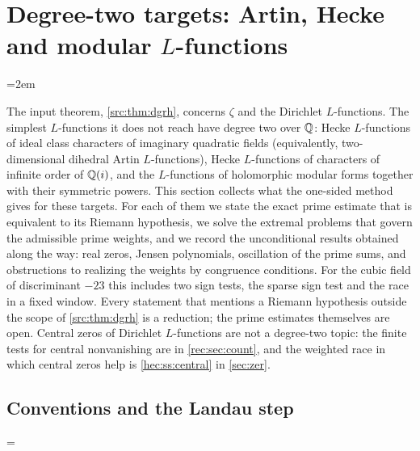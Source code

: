 \providecommand{\zerJ}{\mathcal{J}}
\providecommand{\zerK}{\mathcal{K}}
\providecommand{\zersinc}{\operatorname{sinc}}
\providecommand{\zergE}{\gamma_{\mathrm{E}}}
\providecommand{\zerLL}{\mathcal{L}}
\providecommand{\zerconv}{\operatorname{conv}}
\providecommand{\zerdiag}{\operatorname{diag}}
\providecommand{\zerSym}{\mathfrak{D}}
\providecommand{\zerLog}{\operatorname{Log}}
\section{Degree-two targets: Artin, Hecke and modular \texorpdfstring{$L$}{L}-functions}\label{sec:hec}

\providecommand{\hecsgn}{\operatorname{sgn}}
\providecommand{\hecVar}{\operatorname{Var}}
\providecommand{\hecCov}{\operatorname{Cov}}
\providecommand{\hecE}{\mathbb{E}}
\providecommand{\hecind}{\mathbf{1}}
\edef\hecsavedemergencystretch{\the\emergencystretch}
\emergencystretch=2em\relax

The input theorem, \cref{src:thm:dgrh}, concerns $\zeta$ and the Dirichlet $L$-functions. The simplest
$L$-functions it does not reach have degree two over $\mathbb{Q}$: Hecke $L$-functions of ideal class characters
of imaginary quadratic fields (equivalently, two-dimensional dihedral Artin $L$-functions), Hecke
$L$-functions of characters of infinite order of $\mathbb{Q}(i)$, and the $L$-functions of holomorphic
modular forms together with their symmetric powers. This section collects what the one-sided method
gives for these targets. For each of them we state the exact prime estimate that is equivalent to
its Riemann hypothesis, we solve the extremal problems that govern the admissible prime weights, and we
record the unconditional results obtained along the way: real zeros, Jensen polynomials, oscillation of
the prime sums, and obstructions to realizing the weights by congruence conditions. For the cubic field
of discriminant $-23$ this includes two sign tests, the sparse sign test and the race in a fixed window.
Every statement that mentions a Riemann hypothesis outside the scope of \cref{src:thm:dgrh} is a
reduction; the prime estimates themselves are open. Central zeros of Dirichlet $L$-functions are not a
degree-two topic: the finite tests for central nonvanishing are in \cref{rec:sec:count}, and the
weighted race in which central zeros help is \cref{hec:ss:central} in \cref{sec:zer}.

\subsection{Conventions and the Landau step}\label{hec:ss:landau}
{\emergencystretch=\textwidth{}}

